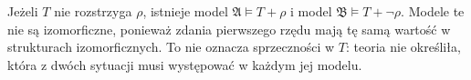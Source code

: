 \begin{przyklad}
Jeżeli $T$ nie rozstrzyga $\rho$, istnieje model $\mathfrak A\models T+\rho$
i model $\mathfrak B\models T+\neg\rho$.
Modele te nie są izomorficzne, ponieważ zdania pierwszego rzędu
mają tę samą wartość w strukturach izomorficznych.
To nie oznacza sprzeczności w $T$: teoria nie określiła,
która z dwóch sytuacji musi występować w każdym jej modelu.
\end{przyklad}